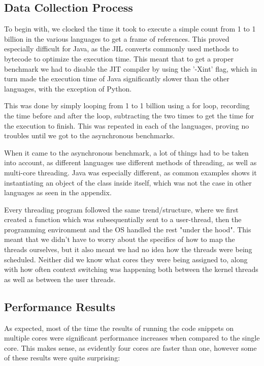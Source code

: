 \documentclass[12pt,a4paper]{article}
\begin{document}
\subsection{Data Collection Process}

To begin with, we clocked the time it took to execute a simple count from 1 to 1 billion in the various languages to get a frame of references. This proved especially difficult for Java, as the JIL converts commonly used methods to bytecode to optimize the execution time. This meant that to get a proper benchmark we had to disable the JIT compiler by using the '-Xint' flag, which in turn made the execution time of Java significantly slower than the other languages, with the exception of Python.

This was done by simply looping from 1 to 1 billion using a for loop, recording the time before and after the loop, subtracting the two times to get the time for the execution to finish. This was repeated in each of the languages, proving no troubles until we got to the asynchronous benchmarks.

When it came to the asynchronous benchmark, a lot of things had to be taken into account, as different languages use different methods of threading, as well as multi-core threading. Java was especially different, as common examples shows it instantiating an object of the class inside itself, which was not the case in other languages as seen in the appendix. 

Every threading program followed the same trend/structure, where we first created a function which was subsequentially sent to a user-thread, then the programming environment and the OS handled the rest "under the hood". This meant that we didn't have to worry about the specifics of how to map the threads ourselves, but it also meant we had no idea how the threads were being scheduled. Neither did we know what cores they were being assigned to, along with how often context switching was happening both between the kernel threads as well as between the user threads. 

\subsection{Performance Results}

As expected, most of the time the results of running the code snippets on multiple cores were significant performance increases when compared to the single core. This makes sense, as evidently four cores are faster than one, however some of these results were quite surprising:
\end{document}
